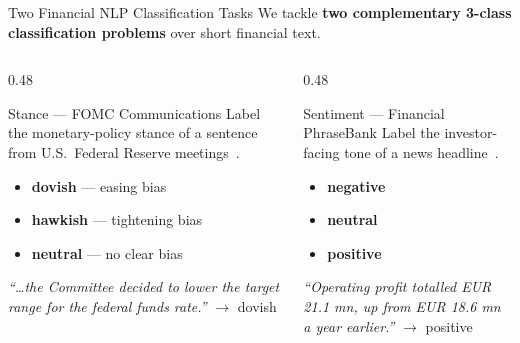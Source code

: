 \documentclass[10pt, aspectratio=169]{beamer}
\begin{document}
\begin{frame}{Two Financial NLP Classification Tasks}
    We tackle \textbf{two complementary 3-class classification problems} over short financial text.

    \vspace{0.3em}
    \begin{columns}[T]
        \begin{column}{0.48\textwidth}
            \begin{block}{Stance --- FOMC Communications}
                Label the monetary-policy stance of a sentence from U.S.\ Federal Reserve meetings~\cite{shah2023trillion}.
                \begin{itemize}\setlength{\itemsep}{1pt}
                    \item \textbf{dovish} --- easing bias
                    \item \textbf{hawkish} --- tightening bias
                    \item \textbf{neutral} --- no clear bias
                \end{itemize}
                \textit{``\ldots the Committee decided to lower the target range for the federal funds rate.''} $\rightarrow$ \alert{dovish}
            \end{block}
        \end{column}
        \begin{column}{0.48\textwidth}
            \begin{block}{Sentiment --- Financial PhraseBank}
                Label the investor-facing tone of a news headline~\cite{malo2014good}.
                \begin{itemize}\setlength{\itemsep}{1pt}
                    \item \textbf{negative}
                    \item \textbf{neutral}
                    \item \textbf{positive}
                \end{itemize}
                \textit{``Operating profit totalled EUR 21.1 mn, up from EUR 18.6 mn a year earlier.''} $\rightarrow$ \alert{positive}
            \end{block}
        \end{column}
    \end{columns}
\end{frame}
\end{document}
